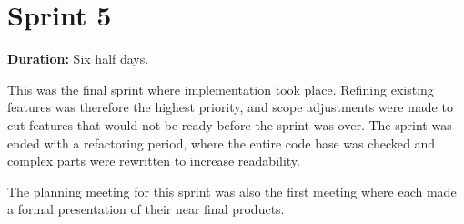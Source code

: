 \section{Sprint 5}%

\textbf{Duration:} Six half days. \newline

This was the final sprint where implementation took place. 
Refining existing features was therefore the highest priority, and scope adjustments were made to cut features that would not be ready before the sprint was over. 
The sprint was ended with a refactoring period, where the entire code base was checked and complex parts were rewritten to increase readability. 

The planning meeting for this sprint was also the first meeting where each \localgroup{} made a formal presentation of their near final products.